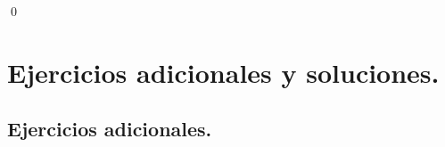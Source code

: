 \documentclass[10pt,a4paper]{article}\usepackage[]{graphicx}\usepackage[]{color}
\begin{document}
\qed


\section{Ejercicios adicionales y soluciones.}
\label{tut10:sec:EjerciciosAdicionalesYSoluciones}

\subsection*{Ejercicios adicionales.}
\label{tut10:subsec:EjerciciosAdicionales}
\end{document}
